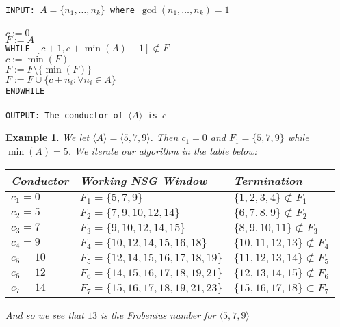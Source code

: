 \documentclass[11pt]{amsart}
\theoremstyle{plain}
\newtheorem{exa}{Example}
\theoremstyle{definition}
\begin{document}
\texttt{
\noindent
\\INPUT: $A=\{n_1,\dots,n_k\}$ where $\gcd(n_1,\dots,n_k)=1$\\
\hspace*{\fill}\\
\hspace*{1em}$c:=0$ \\
\hspace*{1em}$F:=A$ \\
\hspace*{1em}WHILE $[c+1,c+\min(A)-1]\not\subset F$ \\
\hspace*{2em}$c:=\min(F)$\\
\hspace*{2em}$F:=F\setminus\{\min(F)\}$\\
\hspace*{2em}$F:=F\cup\{c+n_i:\forall n_i\in A\}$\\
\hspace*{1em}ENDWHILE\\
\hspace*{\fill}\\
OUTPUT: The conductor of $\langle A\rangle$ is $c$
}

\begin{exa}
We let $\langle A\rangle=\langle 5,7,9\rangle$. Then $c_1=0$ and $F_1=\{5,7,9\}$ while $\min(A)=5$. We iterate our algorithm in the table below:

\begin{tabular}{l|l|l}
  Conductor&Working NSG Window&Termination\\
  \hline
  $c_1=0$&$F_1=\{5,7,9\}$&$\{1,2,3,4\}\not\subset F_1$\\
  $c_2=5$&$F_2=\{7,9,10,12,14\}$&$\{6,7,8,9\}\not\subset F_2$\\
  $c_3=7$&$F_3=\{9,10,12,14,15\}$&$\{8,9,10,11\}\not\subset F_3$\\
  $c_4=9$&$F_4=\{10,12,14,15,16,18\}$&$\{10,11,12,13\}\not\subset F_4$\\
  $c_5=10$&$F_5=\{12,14,15,16,17,18,19\}$&$\{11,12,13,14\}\not\subset F_5$\\
  $c_6=12$&$F_6=\{14,15,16,17,18,19,21\}$&$\{12,13,14,15\}\not\subset F_6$\\
  $c_7=14$&$F_7=\{15,16,17,18,19,21,23\}$&$\{15,16,17,18\}\subset F_7$\\
\end{tabular}

And so we see that $13$ is the Frobenius number for $\langle 5,7,9\rangle$
\end{exa}
\end{document}
